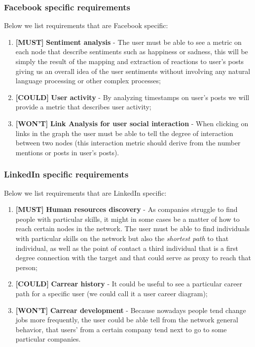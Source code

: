 \subsubsection*{Facebook specific requirements}

Below we list requirements that are Facebook specific:

\begin{enumerate}
    \item \textbf{[MUST]} \textbf{Sentiment analysis} - The user must be able to see a metric on each node that describe sentiments such as happiness or sadness, this will be simply the result of the mapping and extraction of reactions to user's posts giving us an overall idea of the user sentiments without involving any natural language processing or other complex processes;
    \item \textbf{[COULD]} \textbf{User activity} - By analyzing timestamps on user's posts we will provide a metric that describes user activity;
    \item \textbf{[WON'T]} \textbf{Link Analysis for user social interaction} - When clicking on links in the graph the user must be able to tell the degree of interaction between two nodes (this interaction metric should derive from the number mentions or posts in user's posts).
\end{enumerate}

\subsubsection*{LinkedIn specific requirements}

Below we list requirements that are LinkedIn specific:

\begin{enumerate}
    \item \textbf{[MUST]} \textbf{Human resources discovery} - As companies struggle to find people with particular skills, it might in some cases be a matter of how to reach certain nodes in the network. The user must be able to find individuals with particular skills on the network but also the \textit{shortest path} to that individual, as well as the point of contact a third individual that is a first degree connection with the target and that could serve as proxy to reach that person;
    \item \textbf{[COULD]} \textbf{Carrear history} - It could be useful to see a particular career path for a specific user (we could call it a user career diagram);
    \item \textbf{[WON'T]} \textbf{Carrear development} - Because nowadays people tend change jobs more frequently, the user could be able tell from the network general behavior, that users' from a certain company tend next to go to some particular companies.
\end{enumerate}
